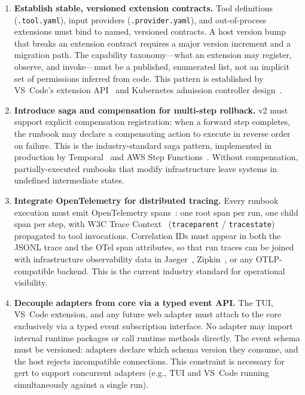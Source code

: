 \begin{enumerate}[label=\textbf{G\arabic*.}]
  \item \textbf{Establish stable, versioned extension contracts.}
    Tool definitions (\texttt{.tool.yaml}), input providers (\texttt{.provider.yaml}), and
    out-of-process extensions must bind to named, versioned contracts. A host version bump that breaks
    an extension contract requires a major version increment and a migration path. The capability
    taxonomy---what an extension may register, observe, and invoke---must be a published, enumerated
    list, not an implicit set of permissions inferred from code. This pattern is established by
    VS~Code's extension API~\cite{vscode-extension-api} and Kubernetes admission controller design~\cite{kubernetes-docs}.

  \item \textbf{Introduce saga and compensation for multi-step rollback.}
    v2 must support explicit compensation registration: when a forward step completes, the runbook may
    declare a compensating action to execute in reverse order on failure. This is the industry-standard
    saga pattern, implemented in production by Temporal~\cite{temporal-docs} and AWS Step Functions~\cite{aws-step-functions}. Without compensation,
    partially-executed runbooks that modify infrastructure leave systems in undefined intermediate
    states.

  \item \textbf{Integrate OpenTelemetry for distributed tracing.}
    Every runbook execution must emit OpenTelemetry spans~\cite{otel-spec}: one root span per run, one child span per
    step, with W3C Trace Context~\cite{w3c-trace-context} (\texttt{traceparent} / \texttt{tracestate}) propagated to tool
    invocations. Correlation IDs must appear in both the JSONL trace and the OTel span attributes, so
    that run traces can be joined with infrastructure observability data in Jaeger~\cite{jaeger-docs}, Zipkin~\cite{zipkin-docs}, or any
    OTLP-compatible backend. This is the current industry standard for operational visibility.

  \item \textbf{Decouple adapters from core via a typed event API.}
    The TUI, VS~Code extension, and any future web adapter must attach to the core exclusively via a
    typed event subscription interface. No adapter may import internal runtime packages or call runtime
    methods directly. The event schema must be versioned: adapters declare which schema version they
    consume, and the host rejects incompatible connections. This constraint is necessary for gert to
    support concurrent adapters (e.g., TUI and VS~Code running simultaneously against a single run).


\end{enumerate}
